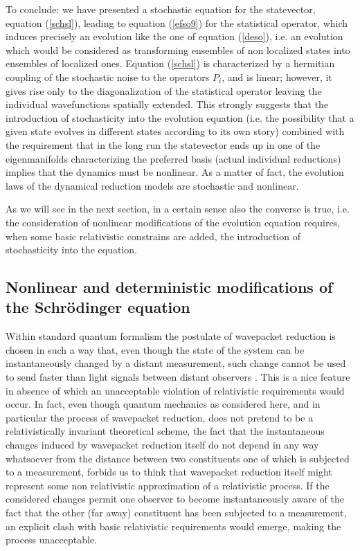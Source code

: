 \documentclass[12pt]{article}
\begin{document}
To conclude: we have presented a stochastic equation for the
statevector, equation (\ref{schsl}), leading to equation
(\ref{efso9}) for the statistical operator, which induces
precisely an evolution like the one of equation (\ref{deso}), i.e.
an evolution which would be considered as transforming ensembles
of non localized states into ensembles of localized ones. Equation
(\ref{schsl}) is characterized by a hermitian coupling of the
stochastic noise to the operators $P_{i}$, and is linear; however,
it gives rise only to the diagonalization of the statistical
operator leaving the individual wavefunctions spatially extended.
This strongly suggests that the introduction of stochasticity into
the evolution equation (i.e. the possibility that a given state
evolves in different states according to its own story) combined
with the requirement that in the long run the statevector ends up
in one of the eigenmanifolds characterizing the preferred basis
(actual individual reductions) implies that the dynamics must be
nonlinear. As a matter of fact, the evolution laws of the
dynamical reduction models are stochastic and nonlinear.

As we will see in the next section, in a certain sense also the
converse is true, i.e. the consideration of nonlinear
modifications of the evolution equation requires, when some basic
relativistic constrains are added, the introduction of
stochasticity into the equation.



\subsection[Nonlinear and deterministic modifications]{Nonlinear
and deterministic modifications of the Schr\"o\-din\-ger equation}
\label{sec43}


Within standard quantum formalism the postulate of wavepacket
reduction is chosen in such a way that, even though the state of
the system can be instantaneously changed by a distant
measurement, such change cannot be used to send faster than light
signals between distant observers \cite{heb,grwfl,gwfl,shi1}. This
is a nice feature in absence of which an unacceptable violation of
relativistic requirements would occur. In fact, even though
quantum mechanics as considered here, and in particular the
process of wavepacket reduction, does not pretend to be a
relativistically invariant theoretical scheme, the fact that the
instantaneous changes induced by wavepacket reduction itself do
not depend in any way whatsoever from the distance between two
constituents one of which is subjected to a measurement, forbids
us to think that wavepacket reduction itself might represent some
non relativistic approximation of a relativistic process. If the
considered changes permit  one observer to become instantaneously
aware of the fact that the other (far away) constituent has been
subjected to a measurement, an explicit clash with basic
relativistic requirements would emerge, making the process
unacceptable.
\end{document}
